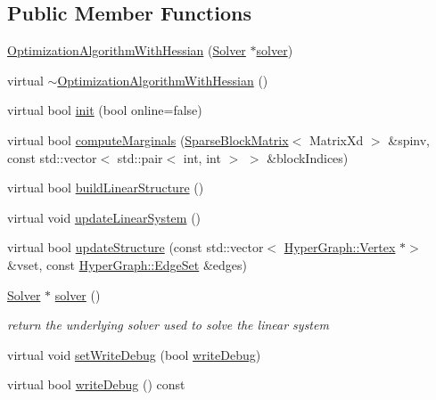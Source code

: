 \subsection*{Public Member Functions}
\begin{DoxyCompactItemize}
\item 
\mbox{\hyperlink{classg2o_1_1_optimization_algorithm_with_hessian_a1358f3500efe8b95a5af4a1b0edecdf0}{Optimization\+Algorithm\+With\+Hessian}} (\mbox{\hyperlink{classg2o_1_1_solver}{Solver}} $\ast$\mbox{\hyperlink{classg2o_1_1_optimization_algorithm_with_hessian_a85473a4073c76b1a52cf9cf175e31c45}{solver}})
\item 
virtual \mbox{\hyperlink{classg2o_1_1_optimization_algorithm_with_hessian_a9cfed4c23f1b09829cf4857cf2213745}{$\sim$\+Optimization\+Algorithm\+With\+Hessian}} ()
\item 
virtual bool \mbox{\hyperlink{classg2o_1_1_optimization_algorithm_with_hessian_ae067a9c2961718dc8a37e3b8478b6d01}{init}} (bool online=false)
\item 
virtual bool \mbox{\hyperlink{classg2o_1_1_optimization_algorithm_with_hessian_af1959727df2b7cf233a171cfed246e9a}{compute\+Marginals}} (\mbox{\hyperlink{classg2o_1_1_sparse_block_matrix}{Sparse\+Block\+Matrix}}$<$ Matrix\+Xd $>$ \&spinv, const std\+::vector$<$ std\+::pair$<$ int, int $>$ $>$ \&block\+Indices)
\item 
virtual bool \mbox{\hyperlink{classg2o_1_1_optimization_algorithm_with_hessian_aa84732c8554039ba0152693837bd1b4a}{build\+Linear\+Structure}} ()
\item 
virtual void \mbox{\hyperlink{classg2o_1_1_optimization_algorithm_with_hessian_a3ceacb3dddb14121b03e0afe7b7cfeaa}{update\+Linear\+System}} ()
\item 
virtual bool \mbox{\hyperlink{classg2o_1_1_optimization_algorithm_with_hessian_adadb23f135e037ce760f4415a0f26269}{update\+Structure}} (const std\+::vector$<$ \mbox{\hyperlink{classg2o_1_1_hyper_graph_1_1_vertex}{Hyper\+Graph\+::\+Vertex}} $\ast$$>$ \&vset, const \mbox{\hyperlink{classg2o_1_1_hyper_graph_a5e2970e236c0dcb4eff7c205d7b6b4ae}{Hyper\+Graph\+::\+Edge\+Set}} \&edges)
\item 
\mbox{\hyperlink{classg2o_1_1_solver}{Solver}} $\ast$ \mbox{\hyperlink{classg2o_1_1_optimization_algorithm_with_hessian_a85473a4073c76b1a52cf9cf175e31c45}{solver}} ()
\begin{DoxyCompactList}\small\item\em return the underlying solver used to solve the linear system \end{DoxyCompactList}\item 
virtual void \mbox{\hyperlink{classg2o_1_1_optimization_algorithm_with_hessian_a655aee24aae72b55f5edafb0a7a15137}{set\+Write\+Debug}} (bool \mbox{\hyperlink{classg2o_1_1_optimization_algorithm_with_hessian_aee8fc3dadc8bfbd50409f2e9940cbebd}{write\+Debug}})
\item 
virtual bool \mbox{\hyperlink{classg2o_1_1_optimization_algorithm_with_hessian_aee8fc3dadc8bfbd50409f2e9940cbebd}{write\+Debug}} () const
\end{DoxyCompactItemize}

